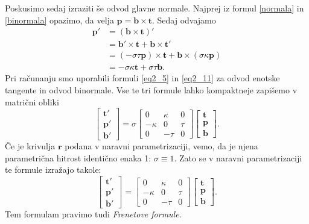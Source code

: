 \documentclass[12pt,a4paper,twoside]{article}
\theoremstyle{definition} %
\theoremstyle{plain} %
\theoremstyle{primerstyle}
\numberwithin{equation}{section}  %
\newcommand{\tV}{\mathbf{t}}
\newcommand{\bV}{\mathbf{b}}
\newcommand{\pV}{\mathbf{p}}
\newcommand{\rV}{\mathbf{r}}
\begin{document}
Poskusimo sedaj izraziti še odvod glavne normale. Najprej iz formul \eqref{normala} in \eqref{binormala} opazimo, da velja $\pV=\bV\times\tV.$ Sedaj odvajamo
\begin{align*}
	\pV'&=(\bV\times\tV)'\\
	&=\bV'\times\tV+\bV\times\tV'\\
	&=(-\sigma\tau\pV)\times\tV+\bV\times(\sigma\kappa\pV)\\
	&=-\sigma\kappa\tV+\sigma\tau\bV.
\end{align*}
Pri računanju smo uporabili formuli \eqref{eq2_5} in \eqref{eq2_11} za odvod enotske tangente in odvod binormale. Vse te tri formule lahko kompaktneje zapišemo v matrični obliki
\begin{equation}
	\label{frenetove_formule}
	\begin{bmatrix}
		\tV'\\
		\pV'\\
		\bV'
	\end{bmatrix}=
	\sigma
	\begin{bmatrix}
		0&\kappa&0\\
		-\kappa&0&\tau\\
		0&-\tau&0
	\end{bmatrix}
	\begin{bmatrix}
		\tV\\
		\pV\\
		\bV
	\end{bmatrix}.
\end{equation}
Če je krivulja $\rV$ podana v naravni parametrizaciji, vemo, da je njena parametrična hitrost identično enaka 1: $\sigma\equiv 1.$ Zato se v naravni parametrizaciji te formule izražajo takole:
\begin{equation}
	\label{naravne_frenetove_formule}
	\begin{bmatrix}
		\tV'\\
		\pV'\\
		\bV'
	\end{bmatrix}=
	\begin{bmatrix}
		0&\kappa&0\\
		-\kappa&0&\tau\\
		0&-\tau&0
	\end{bmatrix}
	\begin{bmatrix}
		\tV\\
		\pV\\
		\bV
	\end{bmatrix}.
\end{equation}
Tem formulam pravimo tudi \emph{Frenetove formule.}
\end{document}
